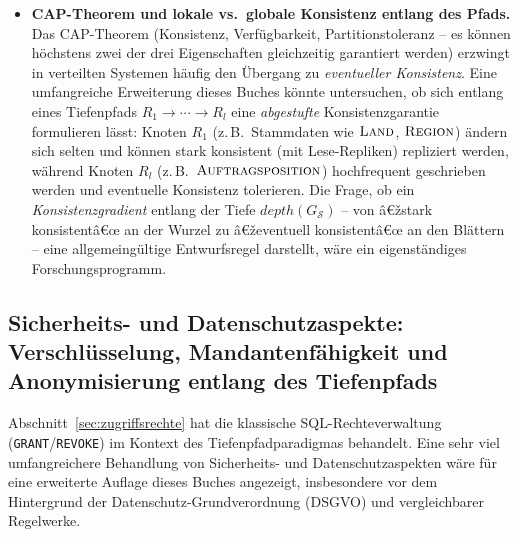 ﻿\documentclass[a4paper,12pt]{report}
\theoremstyle{definition}
\theoremstyle{remark}
\newcommand{\depth}{\mathit{depth}}
\begin{document}
\begin{itemize}
  \item \textbf{CAP-Theorem und lokale vs.\ globale Konsistenz
    entlang des Pfads.} Das CAP-Theorem (Konsistenz,
    Verfügbarkeit, Partitionstoleranz -- es können höchstens zwei der
    drei Eigenschaften gleichzeitig garantiert werden) erzwingt in
    verteilten Systemen häufig den Übergang zu
    \emph{eventueller Konsistenz}. Eine umfangreiche Erweiterung
    dieses Buches könnte untersuchen, ob sich entlang eines
    Tiefenpfads $R_1\to\cdots\to R_l$ eine \emph{abgestufte}
    Konsistenzgarantie formulieren lässt: Knoten $R_1$ (z.\,B.\
    Stammdaten wie $\textsc{Land}$, $\textsc{Region}$) ändern sich
    selten und können stark konsistent (mit Lese-Repliken)
    repliziert werden, während Knoten $R_l$ (z.\,B.\
    $\textsc{Auftragsposition}$) hochfrequent geschrieben werden und
    eventuelle Konsistenz tolerieren. Die Frage, ob ein
    \emph{Konsistenzgradient} entlang der Tiefe $\depth(G_{\mathcal{S}})$
    -- von â€žstark konsistentâ€œ an der Wurzel zu â€ževentuell konsistentâ€œ
    an den Blättern -- eine allgemeingültige Entwurfsregel darstellt,
    wäre ein eigenständiges Forschungsprogramm.
\end{itemize}

\subsection{Sicherheits- und Datenschutzaspekte: Verschlüsselung, Mandantenfähigkeit und Anonymisierung entlang des Tiefenpfads}
\label{sec:ausblick-sicherheit}

Abschnitt~\ref{sec:zugriffsrechte} hat die klassische
SQL-Rechteverwaltung (\texttt{GRANT}/\texttt{REVOKE}) im Kontext des
Tiefenpfadparadigmas behandelt. Eine sehr viel umfangreichere
Behandlung von Sicherheits- und Datenschutzaspekten wäre für eine
erweiterte Auflage dieses Buches angezeigt, insbesondere vor dem
Hintergrund der Datenschutz-Grundverordnung (DSGVO) und vergleichbarer
Regelwerke.
\end{document}
